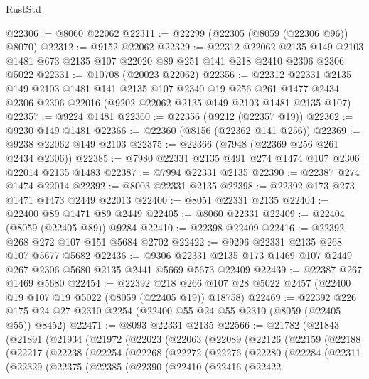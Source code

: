 \begin{lexlean}{RustStd}
\begin{coremodule}
{\begin{coremodule}
{{{{{{{{{{{{{{{{{{{{{{{{{{{{{{{{{{@22306 := @8060 @22062
@22311 := @22299 (@22305 (@8059 (@22306 @96)) @8070)
@22312 := @9152 @22062
@22329 := @22312
    @22062
    @2135
    @149
    @2103
    @1481
    @673
    @2135
    @107
    @22020
    @89
    @251
    @141
    @218
    @2410
    @2306
    @2306
    @5022
@22331 := @10708 (@20023 @22062)
@22356 := @22312
    @22331
    @2135
    @149
    @2103
    @1481
    @141
    @2135
    @107
    @2340
    @19
    @256
    @261
    @1477
    @2434
    @2306
    @2306
    @22016
    (@9202 @22062 @2135 @149 @2103 @1481 @2135 @107)
@22357 := @9224 @1481
@22360 := @22356 (@9212 (@22357 @19))
@22362 := @9230 @149 @1481
@22366 := @22360 (@8156 (@22362 @141 @256))
@22369 := @9238 @22062 @149 @2103
@22375 := @22366 (@7948 (@22369 @256 @261 @2434 @2306))
@22385 := @7980 @22331 @2135 @491 @274 @1474 @107 @2306 @22014 @2135 @1483
@22387 := @7994 @22331 @2135
@22390 := @22387 @274 @1474 @22014
@22392 := @8003 @22331 @2135
@22398 := @22392 @173 @273 @1471 @1473 @2449 @22013
@22400 := @8051 @22331 @2135
@22404 := @22400 @89 @1471 @89 @2449
@22405 := @8060 @22331
@22409 := @22404 (@8059 (@22405 @89)) @9284
@22410 := @22398 @22409
@22416 := @22392 @268 @272 @107 @151 @5684 @2702
@22422 := @9296 @22331 @2135 @268 @107 @5677 @5682
@22436 := @9306 @22331 @2135 @173 @1469 @107 @2449 @267 @2306 @5680 @2135 @2441 @5669 @5673 @22409
@22439 := @22387 @267 @1469 @5680
@22454 := @22392
    @218
    @266
    @107
    @28
    @5022
    @2457
    (@22400 @19 @107 @19 @5022 (@8059 (@22405 @19)) @18758)
@22469 := @22392 @226 @175 @24 @27 @2310 @2254 (@22400 @55 @24 @55 @2310 (@8059 (@22405 @55)) @8452)
@22471 := @8093 @22331 @2135
@22566 := @21782
    (@21843
      (@21891
        (@21934
          (@21972
            (@22023
              (@22063
                (@22089
                  (@22126
                    (@22159
                      (@22188
                        (@22217
                          (@22238
                            (@22254
                              (@22268
                                (@22272
                                  (@22276
                                    (@22280
                                      (@22284
                                        (@22311
                                          (@22329
                                            (@22375
                                              (@22385
                                                (@22390
                                                  (@22410
                                                    (@22416
                                                      (@22422
}}}}}}}}}}}}}}}}}}}}}}}}}}}}}}}}}}
\end{coremodule}}
\end{coremodule}
\end{lexlean}
